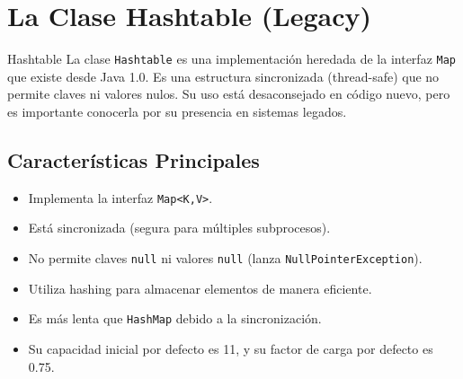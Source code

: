 \section{La Clase Hashtable (Legacy)}
\label{sec:hashtable}

\begin{definicion}{Hashtable}
La clase \texttt{Hashtable} es una implementación heredada de la interfaz \texttt{Map} que existe desde Java 1.0. Es una estructura sincronizada (thread-safe) que no permite claves ni valores nulos. Su uso está desaconsejado en código nuevo, pero es importante conocerla por su presencia en sistemas legados.
\end{definicion}

\subsection{Características Principales}
\begin{itemize}
    \item Implementa la interfaz \texttt{Map<K,V>}.
    \item Está sincronizada (segura para múltiples subprocesos).
    \item No permite claves \texttt{null} ni valores \texttt{null} (lanza \texttt{NullPointerException}).
    \item Utiliza hashing para almacenar elementos de manera eficiente.
    \item Es más lenta que \texttt{HashMap} debido a la sincronización.
    \item Su capacidad inicial por defecto es 11, y su factor de carga por defecto es 0.75.
\end{itemize}

